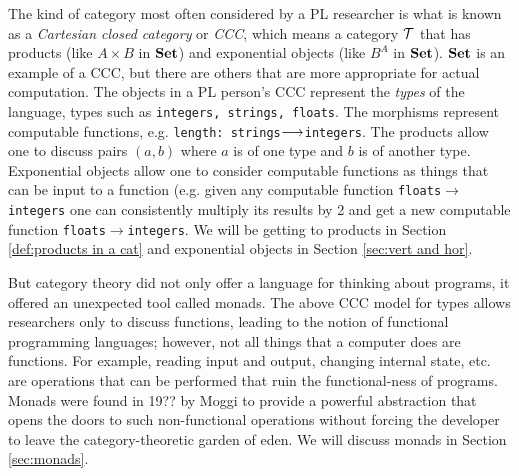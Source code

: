 \documentclass[CT4S-EN-RU]{subfiles}
\begin{document}
\begin{blockRUS}
\end{blockRUS}

\begin{blockENG}
The kind of category most often considered by a PL researcher is what is known as a {\em Cartesian closed category} or {\em CCC}, which means a category $\mathcal{T}$ that has products (like $A\times B$ in ${\mathbf{Set}}$) and exponential objects (like $B^A$ in ${\mathbf{Set}}$). ${\mathbf{Set}}$ is an example of a CCC, but there are others that are more appropriate for actual computation. The objects in a PL person's CCC represent the {\em types} of the language, types such as {\tt integers, strings, floats}. The morphisms represent computable functions, e.g. {\tt length: strings}$\longrightarrow${\tt integers}. The products allow one to discuss pairs $(a,b)$ where $a$ is of one type and $b$ is of another type. Exponential objects allow one to consider computable functions as things that can be input to a function (e.g. given any computable function {\tt floats}$\to${\tt integers} one can consistently multiply its results by 2 and get a new computable function {\tt floats}$\to${\tt integers}. We will be getting to products in Section \ref{def:products in a cat} and exponential objects in Section \ref{sec:vert and hor}. 
\end{blockENG}

\begin{blockRUS}
\end{blockRUS}

\begin{blockENG}
But category theory did not only offer a language for thinking about programs, it offered an unexpected tool called monads. The above CCC model for types allows researchers only to discuss functions, leading to the notion of functional programming languages; however, not all things that a computer does are functions. For example, reading input and output, changing internal state, etc. are operations that can be performed that ruin the functional-ness of programs. Monads were found in 19?? by Moggi \cite{Mog} to provide a powerful abstraction that opens the doors to such non-functional operations without forcing the developer to leave the category-theoretic garden of eden. We will discuss monads in Section \ref{sec:monads}.
\end{blockENG}

\begin{blockRUS}
\end{blockRUS}
\end{document}

